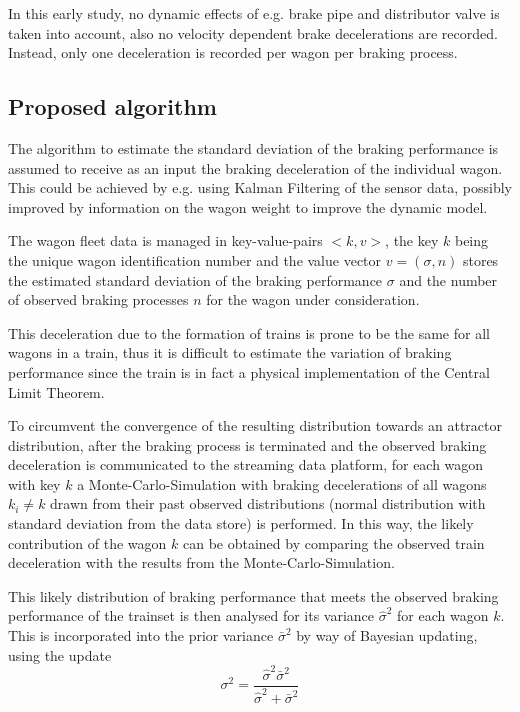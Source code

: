\documentclass[a4paper, 12pt]{scrartcl}
\begin{document}
In this early study, no dynamic effects of e.g. brake pipe and distributor valve is taken into account, also no velocity dependent brake decelerations are recorded. Instead, only one deceleration is recorded per wagon per braking process.

\subsection{Proposed algorithm}
The algorithm to estimate the standard deviation of the braking performance is assumed to receive as an input the braking deceleration of the individual wagon. This could be achieved by e.g. using Kalman Filtering of the sensor data, possibly improved by information on the wagon weight to improve the dynamic model.

The wagon fleet data is managed in key-value-pairs $<k, v>$, the key $k$ being the unique wagon identification number and the value vector $v = \left(\sigma, n\right)$ stores the estimated standard deviation of the braking performance $\sigma$ and the number of observed braking processes $n$ for the wagon under consideration.

This deceleration due to the formation of trains is prone to be the same for all wagons in a train, thus it is difficult to estimate the variation of braking performance since the train is in fact a physical implementation of the Central Limit Theorem. 

To circumvent the convergence of the resulting distribution towards an attractor distribution, after the braking process is terminated and the observed braking deceleration is communicated to the streaming data platform, for each wagon with key $k$ a Monte-Carlo-Simulation with braking decelerations of all wagons $k_{i} \neq k$ drawn from their past observed distributions (normal distribution with standard deviation from the data store) is performed. In this way, the likely contribution of the wagon $k$ can be obtained by comparing the observed train deceleration with the results from the Monte-Carlo-Simulation.

This likely distribution of braking performance that meets the observed braking performance of the trainset is then analysed for its variance $\hat{\sigma}^2$ for each wagon $k$. This is incorporated into the prior variance $\bar{\sigma}^2$ by way of Bayesian updating, using the update \cite{gelman2014bayesian}
\begin{equation}
\sigma^2 = \frac{\hat{\sigma}^2 \bar{\sigma}^2}{\hat{\sigma}^2 + \bar{\sigma}^2}
\end{equation}
\end{document}
